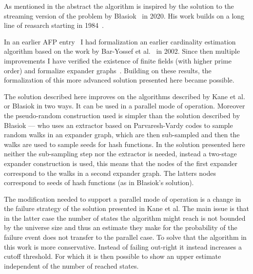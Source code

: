 \documentclass[11pt,a4paper]{article}
\begin{document}
As mentioned in the abstract the algorithm is inspired by the solution to the streaming version
of the problem by B\l{}asiok~\cite{blasiok2020} in 2020. His work builds on a long line of reasarch
starting in 1984~\cite{flajolet1984, alon1999, baryossef2002, kane2010, woodruff2004, gibbons2001}.

In an earlier AFP entry~\cite{Frequency_Moments-AFP} I had formalization an earlier cardinality 
estimation algorithm based on the work by Bar-Yossef et al.~\cite{baryossef2002} in 2002. Since then
multiple improvements I have verified the existence of finite fields (with higher prime order) and 
formalize expander graphs~\cite{Finite_Fields-AFP, Expander_Graphs-AFP}. Building on these results,
the formalization of this more advanced solution presented here became possible.

The solution described here improves on the algorithms described by Kane et al. or B\l{}asiok
in two ways. It can be used in a parallel mode of operation. Moreover the pseudo-random construction
used is simpler than the solution described by B\l{}asiok --- who uses an extractor based on 
Parvaresh-Vardy codes to sample random walks in an expander graph, which are then sub-sampled and
then the walks are used to sample seeds for hash functions. In the solution presented here neither
the sub-sampling step nor the extractor is needed, instead a two-stage expander construction is
used, this means that the nodes of the first expander correspond to the walks in a second expander
graph. The latters nodes correspond to seeds of hash functions (as in B\l{}asiok's solution).

The modification needed to support a parallel mode of operation is a change in the failure strategy
of the solution presented in Kane et al. The main issue is that in the latter case the number of
states the algorithm might reach is not bounded by the universe size and thus an estimate they make
for the probability of the failure event does not transfer to the parallel case. To solve that the
algorithm in this work is more conservative. Instead of failing out-right it instead increases a
cutoff threshold. For which it is then possible to show an upper estimate independent of the number
of reached states.





\end{document}

